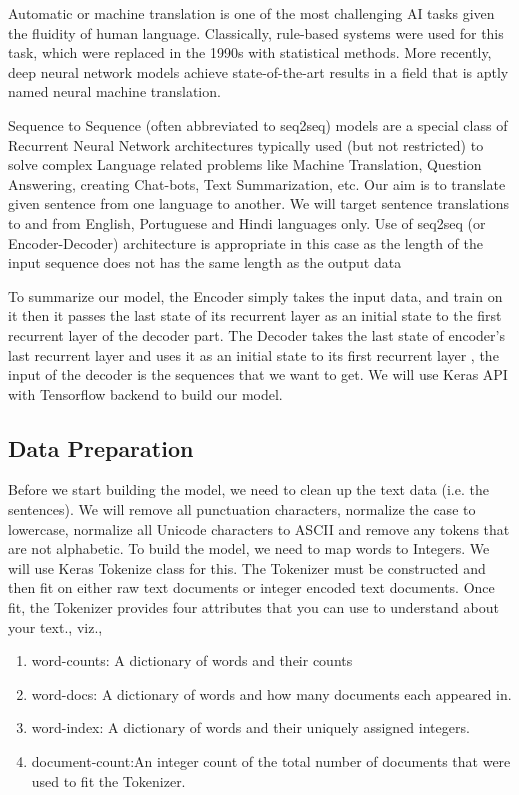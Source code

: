 \documentclass{llncs}
\begin{document}
	Automatic or machine translation is one of the most challenging AI tasks given the fluidity of human language. Classically, rule-based systems were used for this task, which were replaced in the 1990s with statistical methods. More recently, deep neural network models achieve state-of-the-art results in a field that is aptly named neural machine translation. 
	
	Sequence to Sequence (often abbreviated to seq2seq) models are a special class of Recurrent Neural Network architectures typically used (but not restricted) to solve complex Language related problems like Machine Translation, Question Answering, creating Chat-bots, Text Summarization, etc. Our aim is to translate given sentence from one language to another. We will target sentence translations to and from English, Portuguese and  Hindi languages only. Use of seq2seq (or Encoder-Decoder) architecture is appropriate in this case as the length of the input sequence  does not has the same length as the output data
	
	To summarize our model, the Encoder simply takes the input data, and train on it then it passes the last state of its recurrent layer as an initial state to the first recurrent layer of the decoder part. The Decoder takes the last state of encoder’s last recurrent layer and uses it as an initial state to its first recurrent layer , the input of the decoder is the sequences that we want to get. We will use Keras API with Tensorflow backend to build our model.


	\subsection{Data Preparation}
	Before we start building the model, we need to clean up the text data (i.e. the sentences). We will remove all punctuation characters, normalize the case to lowercase, normalize all Unicode characters to ASCII and remove any tokens that are not alphabetic. To build the model, we need to map words to Integers. We will use Keras Tokenize class for this. The Tokenizer must be constructed and then fit on either raw text documents or integer encoded text documents. Once fit, the Tokenizer provides four attributes that you can use to understand about your text., viz.,
					\begin{enumerate}
						 \item word-counts: A dictionary of words and their counts
						 \item word-docs: A dictionary of words and how many documents each appeared in.
						\item word-index: A dictionary of words and their uniquely assigned integers.
						\item document-count:An integer count of the total number of documents that were used to fit the Tokenizer.
					\end{enumerate}
	
\end{document}

